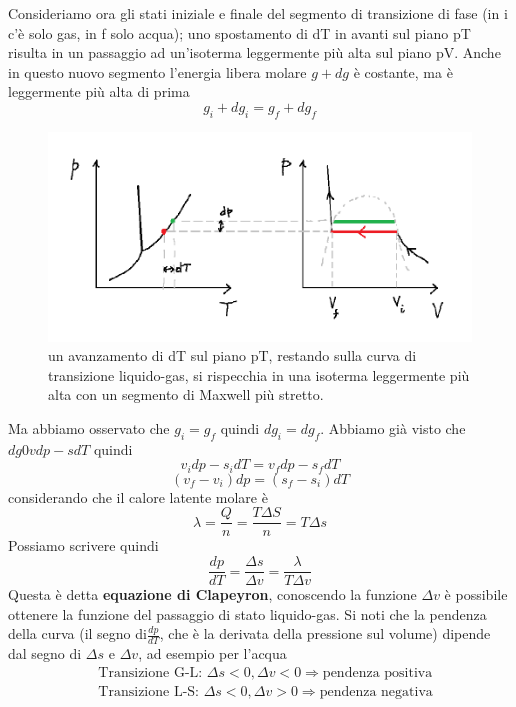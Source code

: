 \documentclass[10pt,a4paper]{article}
\begin{document}
Consideriamo ora gli stati iniziale e finale del segmento di transizione di fase (in i c'è solo gas, in f solo acqua); uno spostamento di dT in avanti sul piano pT risulta in un passaggio ad un'isoterma leggermente più alta sul piano pV. Anche in questo nuovo segmento l'energia libera molare \(g+dg\) è costante, ma è leggermente più alta di prima
\[g_i + dg_i = g_f + dg_f\]
\begin{figure}[h!]
	\centering
	\includegraphics[width=0.4\linewidth]{../images/equaz_passaggio_stato(1)}
	\caption{un avanzamento di dT sul piano pT, restando sulla curva di transizione liquido-gas, si rispecchia in una isoterma leggermente più alta con un segmento di Maxwell più stretto.}
	\label{fig:equazpassaggiostato1}
\end{figure}
Ma abbiamo osservato che \(g_i = g_f\) quindi \(dg_i = dg_f\). Abbiamo già visto che \(dg 0 vdp - sdT\) quindi
 \[v_idp - s_idT = v_f dp -s_fdT\]
 \[(v_f - v_i)dp = (s_f -s_i)dT\]
 considerando che il calore latente molare è
 \[\lambda= \frac{Q}{n}=\frac{T\Delta S}{n}=T\Delta s\]
 Possiamo scrivere quindi
 \[\frac{dp}{dT}=\frac{\Delta s}{\Delta v} = \frac{\lambda}{T\Delta v}\]
 Questa è detta \textbf{equazione di Clapeyron}, conoscendo la funzione \(\Delta v\) è possibile ottenere la funzione del passaggio di stato liquido-gas. Si noti che la pendenza della curva (il segno di$\frac{dp}{dT}$, che è la derivata della pressione sul volume) dipende dal segno di $\Delta s$ e $\Delta v$, ad esempio per l'acqua
 \begin{align*}
 	&\text{Transizione G-L: }\Delta s< 0, \Delta v < 0 \Rightarrow \text{pendenza positiva}\\
 	&\text{Transizione L-S: }\Delta s< 0, \Delta v > 0 \Rightarrow \text{pendenza negativa}
 \end{align*}
\end{document}
